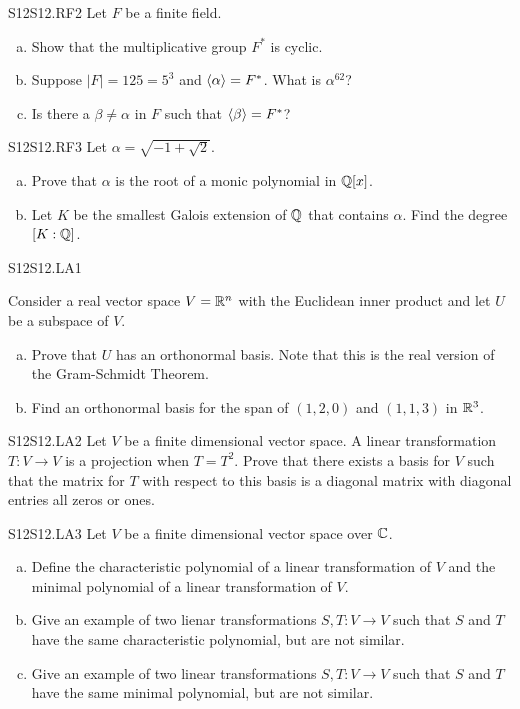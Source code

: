 \documentclass[../AlgebraQualSolutions.tex]{subfiles}
\begin{document}
\begin{prob}{S12}{S12.RF2}
	Let $F$ be a finite field.

	\begin{enumerate}[(a)]
		\item Show that the multiplicative group $F^*$ is cyclic.
		\item Suppose $|F| = 125 = 5^3$ and $\langle \alpha \rangle = F^*$. What is $\alpha^{62}$?
		\item Is there a $\beta \neq \alpha$ in $F$ such that $\langle \beta \rangle = F^*$?
	\end{enumerate}
\end{prob}

\begin{prob}{S12}{S12.RF3}
	Let $\alpha = \sqrt{-1+\sqrt{2}}$.
	\begin{enumerate}[(a)]
		\item Prove that $\alpha$ is the root of a monic polynomial in $\mathbb{Q}[x]$.
		\item Let $K$ be the smallest Galois extension of $\mathbb{Q}$ that contains $\alpha$. Find the degree $[K: \mathbb{Q}]$.
	\end{enumerate}
\end{prob}

\begin{prob}{S12}{S12.LA1}

	Consider a real vector space $V = \mathbb{R}^n$ with the Euclidean inner product and let $U$ be a subspace of $V$.

	\begin{enumerate}[(a)]
		\item Prove that $U$ has an orthonormal basis. Note that this is the real version of the Gram-Schmidt Theorem.
		\item Find an orthonormal basis for the span of $(1,2,0)$ and $(1,1,3)$ in $\mathbb{R}^3$.
	\end{enumerate}
\end{prob}

\begin{prob}{S12}{S12.LA2}
	Let $V$ be a finite dimensional vector space. A linear transformation $T: V \to V$ is a projection when $T = T^2$. Prove that there exists a basis for $V$ such that the matrix for $T$ with respect to this basis is a diagonal matrix with diagonal entries all zeros or ones.
\end{prob}

\begin{prob}{S12}{S12.LA3}
	Let $V$ be a finite dimensional vector space over $\mathbb{C}$.

	\begin{enumerate}[(a)]
		\item Define the characteristic polynomial of a linear transformation of $V$ and the minimal polynomial of a linear transformation of $V$.
		\item Give an example of two lienar transformations $S,T: V \to V$ such that $S$ and $T$ have the same characteristic polynomial, but are not similar.
		\item Give an example of two linear transformations $S,T: V \to V$ such that $S$ and $T$ have the same minimal polynomial, but are not similar.
	\end{enumerate}
\end{prob}
\end{document}
